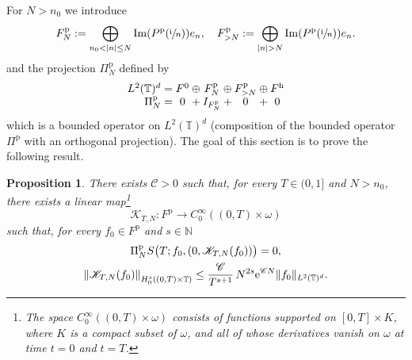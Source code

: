 \documentclass[10pt]{amsart}
\let\mathcal\mathscr
\theoremstyle{plain}
\newtheorem{prop}[theorem]{Proposition}
\theoremstyle{definition}
\theoremstyle{remark}
\DeclareMathOperator{\Ima}{Im}
\newcommand{\set}{\mathbb}
\newcommand{\N}{\set{N}}
\newcommand{\T}{\set{T}}
\newcommand{\coloneqq}{\mathrel{\mathord{:}\mathord=}}
\newcommand{\h}{{\mathrm h}}
\newcommand{\p}{{\mathrm p}}
\newcommand{\eu}{\mathrm e}
\newcommand{\iu}{\mathrm i}
\let\originalleft\left
\let\originalright\right
\renewcommand{\left}{\mathopen{}\mathclose\bgroup\originalleft}
\renewcommand{\right}{\aftergroup\egroup\originalright}
\begin{document}

For $N>n_0$ we introduce
\begin{equation} \label{def:FpN}
F^\p_N \coloneqq \bigoplus\limits_{n_0 < |n| \leq N} \Ima\left(P^\p(\sfrac{\iu}{n})\right) e_n,
\quad
F^\p_{>N} \coloneqq\bigoplus\limits_{|n|>N } \Ima\left(P^\p(\sfrac{\iu}{n})\right) e_n.
\end{equation}
and the projection $\Pi^\p_N$ defined by
\[
\begin{array}{r@{}c@{}c@{}c@{}c@{}c@{}c@{}c@{}c}
L^2(\T)^d & {}={} & F^0 & {}\oplus{} & F^\p_N & {}\oplus{} & F^\p_{>N} & {}\oplus{} & F^\h \\
\Pi^\p_N &{} = {}& 0 &{} + {}& I_{F^\p_N} &{} +{} & 0 & {}+{} & 0
\end{array}
\]
which is a bounded operator on $L^2(\T)^d$ (composition of the bounded operator $\Pi^\p$ with an orthogonal projection).
The goal of this section is to prove the following result.

\begin{prop} \label{Prop:FNPF}
There exists $\mathcal{C}>0$ such that, for every $T \in(0,1]$ and $N>n_0$, there exists a linear map\footnote{The space $C_0^\infty((0,T)\times \omega)$ consists of functions supported on $[0,T]\times K$, where $K$ is a compact subset of $\omega$, and
all of whose derivatives vanish on $\omega$ at time $t=0$ and $t=T$.}
\[
\mathcal{K}_{T,N}\colon F^\p \to C^\infty_0((0,T) \times \omega)
\]
such that, for every $f_0 \in F^\p$ and $s \in\N$
\begin{gather*}
\Pi^\p_N S \bigl(T ; f_0, \left(0,\mathcal{K}_{T,N}(f_0)\right) \bigr) = 0,\\
\left\| \mathcal{K}_{T,N}(f_0) \right\|_{H_0^s((0,T)\times\T)} \leq \frac{\mathcal{C} }{ T^{s+1} }\, N^{2s} \eu^{\mathcal{C} N} \|f_0\|_{L^2(\T)^d}.
\end{gather*}
\end{prop}
\end{document}
